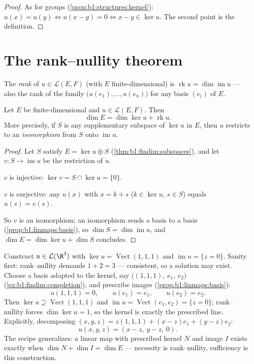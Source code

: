 \begin{proof}
As for groups (\cref{prop:b1:structures:kernel}): $u(x) = u(y) \iff
u(x - y) = 0 \iff x - y \in \ker u$. The second point is the
definition.
\end{proof}

\section{The rank--nullity theorem}

\begin{definition}\label{def:b1:linmaps:rank}
The \emph{rank} of $u \in \mathcal{L}(E,
F)$ (with $E$ finite-dimensional) is $\operatorname{rk} u = \dim
\operatorname{im} u$ --- also the rank of the family
$\bigl(u(e_1), \dots, u(e_n)\bigr)$ for any basis $(e_i)$ of $E$.
\end{definition}

\begin{theorem}\label{thm:b1:linmaps:ranknullity}
Let $E$ be finite-dimensional and $u \in \mathcal{L}(E, F)$.
Then
\[
\dim E = \dim \ker u + \operatorname{rk} u .
\]
More precisely, if $S$ is any supplementary subspace of $\ker u$ in
$E$, then $u$ restricts to an \emph{isomorphism} from $S$ onto
$\operatorname{im} u$.
\end{theorem}

\begin{proof}
Let $S$ satisfy $E = \ker u \oplus S$
(\cref{thm:b1:findim:subspaces}), and let $v \colon S \to
\operatorname{im} u$ be the restriction of $u$.

$v$ is injective: $\ker v = S \cap \ker u = \{0\}$.

$v$ is surjective: any $u(x)$ with $x = k + s$ ($k \in \ker u$, $s
\in S$) equals $u(s) = v(s)$.

So $v$ is an isomorphism; an isomorphism sends a basis to a basis
(\cref{prop:b1:linmaps:basis}), so $\dim S = \dim\operatorname{im}
u$, and $\dim E = \dim\ker u + \dim S$ concludes.
\end{proof}

\begin{example}
\label{ex:b1:linmaps:tospec}
Construct $u \in \mathcal{L}(\R^3)$ with $\ker u =
\operatorname{Vect}(1,1,1)$ and $\operatorname{im} u = \{z =
0\}$. Sanity first: rank--nullity demands $1 + 2 = 3$ ---
consistent, so a solution may exist. Choose a basis adapted to
the kernel, say $\bigl((1,1,1),\ e_1,\ e_2\bigr)$
(\cref{ex:b1:findim:completion}), and prescribe images
(\cref{prop:b1:linmaps:basis}):
\[
u(1,1,1) = 0, \qquad u(e_1) = e_1, \qquad u(e_2) = e_2 .
\]
Then $\ker u \supseteq \operatorname{Vect}(1,1,1)$ and
$\operatorname{im} u = \operatorname{Vect}(e_1, e_2) = \{z =
0\}$; rank--nullity forces $\dim\ker u = 1$, so the kernel is
exactly the prescribed line. Explicitly, decomposing $(x, y, z)
= z(1,1,1) + (x - z)e_1 + (y - z)e_2$:
\[
u(x, y, z) = (x - z,\ y - z,\ 0).
\]
The recipe generalizes: a linear map with prescribed kernel $N$
and image $I$ exists exactly when $\dim N + \dim I = \dim E$
--- necessity is rank--nullity, sufficiency is this
construction.
\end{example}

